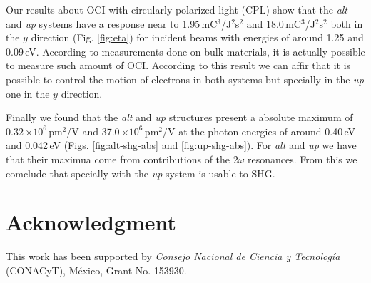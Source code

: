 \documentclass[pss]{wiley2sp} %
\begin{document}
Our results about OCI with circularly polarized light (CPL) show that the \emph{alt}  and \emph{up} systems have a response near to 1.95\,mC$^{3}$/J$^{2}$s$^{2}$ and 18.0\,mC$^{3}$/J$^{2}$s$^{2}$ both in the $y$ direction (Fig. \ref{fig:eta}) for incident beams with energies of around 1.25 and 0.09\,eV. According to measurements done on bulk materials, it is actually possible to measure such amount of OCI. According to this result we can affir that it is possible to control the motion of electrons in both systems but specially in the \emph{up} one in the $y$ direction.

Finally we found that the \emph{alt} and \emph{up} structures present a absolute maximum of 0.32\,$\times10^{6} $\,pm$^{2}$/V and 37.0\,$\times10^{6} $\,pm$^{2}$/V at the photon energies of around 0.40\,eV and 0.042\,eV (Figs. \ref{fig:alt-shg-abs} and \ref{fig:up-shg-abs}). For \emph{alt} and \emph{up} we have that their maximua come from contributions of the 2$\omega$ resonances. From this we comclude that specially with the \emph{up} system is usable to SHG.


\section{Acknowledgment} %

This work has been supported by \emph{Consejo Nacional de Ciencia y
Tecnolog\'ia} (CONACyT), M\'exico, Grant No. 153930.




\end{document}
